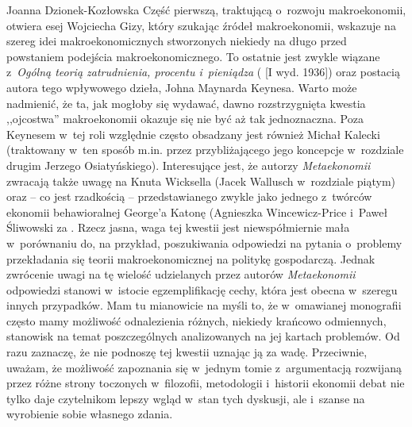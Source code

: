 \begin{recplenv}{Joanna Dzionek-Kozłowska}
Część pierwszą, traktującą o~rozwoju makroekonomii, otwiera esej Wojciecha Gizy, który szukając źródeł makroekonomii,
wskazuje na szereg idei makroekonomicznych stworzonych niekiedy na długo przed powstaniem podejścia makroekonomicznego.
To ostatnie jest zwykle wiązane z~\textit{Ogólną teorią zatrudnienia, procentu i~pieniądza}
(\cite{keynes_ogolna_2003} [I wyd. 1936])
oraz postacią autora tego wpływowego dzieła, Johna
Maynarda Keynesa. Warto może nadmienić, że ta, jak mogłoby się wydawać, dawno rozstrzygnięta kwestia ,,ojcostwa''
makroekonomii okazuje się nie być aż tak jednoznaczna. Poza Keynesem w~tej roli względnie często obsadzany jest również
Michał Kalecki (traktowany w~ten sposób m.in. przez przybliżającego jego koncepcje w~rozdziale drugim Jerzego
Osiatyńskiego). Interesujące jest, że autorzy \textit{Metaekonomii} zwracają także uwagę na Knuta Wicksella (Jacek
Wallusch w~rozdziale piątym) oraz -- co jest rzadkością -- przedstawianego zwykle jako jednego z~twórców ekonomii
behawioralnej George’a Katonę (Agnieszka Wincewicz-Price i~Paweł Śliwowski za
\parencite{colander_complexity_2014}.
Rzecz jasna, waga tej kwestii jest niewspółmiernie mała w~porównaniu do, na przykład, poszukiwania
odpowiedzi na pytania o~problemy przekładania się teorii makroekonomicznej na politykę gospodarczą. Jednak zwrócenie
uwagi na tę wielość udzielanych przez autorów \textit{Metaekonomii} odpowiedzi stanowi w~istocie egzemplifikację cechy,
która jest obecna w~szeregu innych przypadków. Mam tu mianowicie na myśli to, że w~omawianej monografii często mamy
możliwość odnalezienia różnych, niekiedy krańcowo odmiennych, stanowisk na temat poszczególnych analizowanych na jej
kartach problemów. Od razu zaznaczę, że nie podnoszę tej kwestii uznając ją za wadę. Przeciwnie, uważam, że możliwość
zapoznania się w~jednym tomie z~argumentacją rozwijaną przez różne strony toczonych w~filozofii, metodologii i~historii
ekonomii debat nie tylko daje czytelnikom lepszy wgląd w~stan tych dyskusji, ale i~szanse na wyrobienie sobie własnego
zdania.


\end{recplenv}
